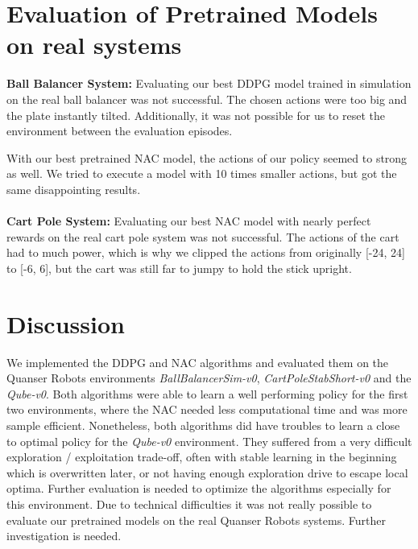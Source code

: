 

\section{Evaluation of Pretrained Models on real systems}

\textbf{Ball Balancer System:} Evaluating our best DDPG model trained in simulation on the real ball balancer was not successful. The chosen actions were too big and the plate instantly tilted. Additionally, it was not possible for us to reset the environment between the evaluation episodes.

With our best pretrained NAC model, the actions of our policy seemed to strong as well. We tried to execute a model with 10 times smaller actions, but got the same disappointing results.
\\\\
\textbf{Cart Pole System:} Evaluating our best NAC model with nearly perfect rewards on the real cart pole system was not successful. The actions of the cart had to much power, which is why we clipped the actions from originally [-24, 24] to [-6, 6], but the cart was still far to jumpy to hold the stick upright.




\section{Discussion}
We implemented the DDPG and NAC algorithms and evaluated them on the Quanser Robots environments \textit{BallBalancerSim-v0}, \textit{CartPoleStabShort-v0} and the \textit{Qube-v0}. Both algorithms were able to learn a well performing policy for the first two environments, where the NAC needed less computational time and was more sample efficient. Nonetheless, both algorithms did have troubles to learn a close to optimal policy for the \textit{Qube-v0} environment. They suffered from a very difficult exploration / exploitation trade-off, often with stable learning in the beginning which is overwritten later, or not having enough exploration drive to escape local optima. Further evaluation is needed to optimize the algorithms especially for this environment. Due to technical difficulties it was not really possible to evaluate our pretrained models on the real Quanser Robots systems. Further investigation is needed.
\label{sec:conclusion}






